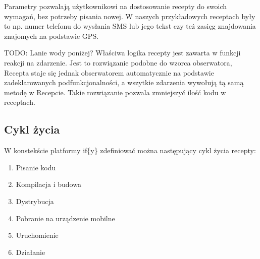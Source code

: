 \documentclass[11pt,a4paper,polish,thesis]{dcsbook}
\begin{document}
Parametry pozwalają użytkownikowi na dostosowanie recepty do swoich wymagań, bez potrzeby pisania nowej. W naszych przykładowych receptach były to np. numer telefonu do wysłania SMS lub jego tekst czy też zasięg znajdowania znajomych na podstawie GPS.


TODO: Lanie wody poniżej?
Właściwa logika recepty jest zawarta w funkcji reakcji na zdarzenie. Jest to rozwiązanie podobne do wzorca obserwatora, Recepta staje się jednak obserwatorem automatycznie na podstawie zadeklarowanych podfunkcjonalności, a wszytkie zdarzenia wywołują tą samą metodę w Recepcie. Takie rozwiązanie pozwala zmniejszyć ilość kodu w receptach.

\subsection{Cykl życia}
W konstekście platformy if\{y\} zdefiniować można następujący cykl życia recepty:
\begin{enumerate}
\item Pisanie kodu
\item Kompilacja i budowa
\item Dystrybucja
\item Pobranie na urządzenie mobilne
\item Uruchomienie
\item Działanie
\end{enumerate}
\end{document}
